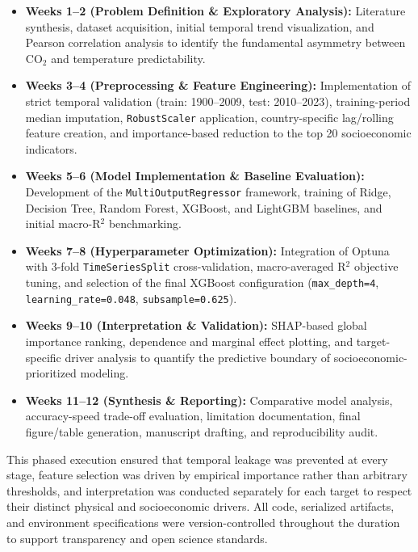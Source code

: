 \documentclass[12pt, a4paper]{article}
\begin{document}
\begin{itemize}[leftmargin=*]
    \item \textbf{Weeks 1--2 (Problem Definition \& Exploratory Analysis):} Literature synthesis, dataset acquisition, initial temporal trend visualization, and Pearson correlation analysis to identify the fundamental asymmetry between CO$_2$ and temperature predictability.
    \item \textbf{Weeks 3--4 (Preprocessing \& Feature Engineering):} Implementation of strict temporal validation (train: 1900--2009, test: 2010--2023), training-period median imputation, \texttt{RobustScaler} application, country-specific lag/rolling feature creation, and importance-based reduction to the top 20 socioeconomic indicators.
    \item \textbf{Weeks 5--6 (Model Implementation \& Baseline Evaluation):} Development of the \texttt{MultiOutputRegressor} framework, training of Ridge, Decision Tree, Random Forest, XGBoost, and LightGBM baselines, and initial macro-R$^2$ benchmarking.
    \item \textbf{Weeks 7--8 (Hyperparameter Optimization):} Integration of Optuna with 3-fold \texttt{TimeSeriesSplit} cross-validation, macro-averaged R$^2$ objective tuning, and selection of the final XGBoost configuration (\texttt{max\_depth=4}, \texttt{learning\_rate=0.048}, \texttt{subsample=0.625}).
    \item \textbf{Weeks 9--10 (Interpretation \& Validation):} SHAP-based global importance ranking, dependence and marginal effect plotting, and target-specific driver analysis to quantify the predictive boundary of socioeconomic-prioritized modeling.
    \item \textbf{Weeks 11--12 (Synthesis \& Reporting):} Comparative model analysis, accuracy-speed trade-off evaluation, limitation documentation, final figure/table generation, manuscript drafting, and reproducibility audit.
\end{itemize}

This phased execution ensured that temporal leakage was prevented at every stage, feature selection was driven by empirical importance rather than arbitrary thresholds, and interpretation was conducted separately for each target to respect their distinct physical and socioeconomic drivers. All code, serialized artifacts, and environment specifications were version-controlled throughout the duration to support transparency and open science standards.
\end{document}
